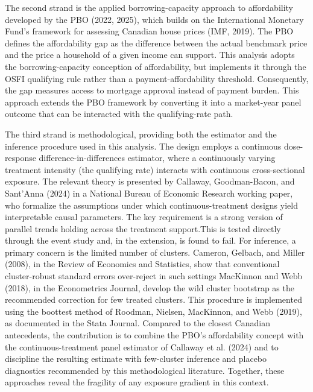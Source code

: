 \documentclass[12pt]{article}
\begin{document}
The second strand is the applied borrowing-capacity approach to affordability developed by the PBO (2022, 2025), which builds on the International Monetary Fund's framework for assessing Canadian house prices (IMF, 2019). The PBO defines the affordability gap as the difference between the actual benchmark price and the price a household of a given income can support. This analysis adopts the borrowing-capacity conception of affordability, but implements it through the OSFI qualifying rule rather than a payment-affordability threshold. Consequently, the gap measures access to mortgage approval instead of payment burden. This approach extends the PBO framework by converting it into a market-year panel outcome that can be interacted with the qualifying-rate path.

The third strand is methodological, providing both the estimator and the inference procedure used in this analysis. The design employs a continuous dose-response difference-in-differences estimator, where a continuously varying treatment intensity (the qualifying rate) interacts with continuous cross-sectional exposure. The relevant theory is presented by Callaway, Goodman-Bacon, and Sant'Anna (2024) in a National Bureau of Economic Research working paper, who formalize the assumptions under which continuous-treatment designs yield interpretable causal parameters. The key requirement is a strong version of parallel trends holding across the treatment support.This is tested directly through the event study and, in the extension, is found to fail. For inference, a primary concern is the limited number of clusters. Cameron, Gelbach, and Miller (2008), in the Review of Economics and Statistics, show that conventional cluster-robust standard errors over-reject in such settings MacKinnon and Webb (2018), in the Econometrics Journal, develop the wild cluster bootstrap as the recommended correction for few treated clusters. This procedure is implemented using the boottest method of Roodman, Nielsen, MacKinnon, and Webb (2019), as documented in the Stata Journal. Compared to the closest Canadian antecedents, the contribution is to combine the PBO's affordability concept with the continuous-treatment panel estimator of Callaway et al. (2024) and to discipline the resulting estimate with few-cluster inference and placebo diagnostics recommended by this methodological literature. Together, these approaches reveal the fragility of any exposure gradient in this context.




\end{document}

